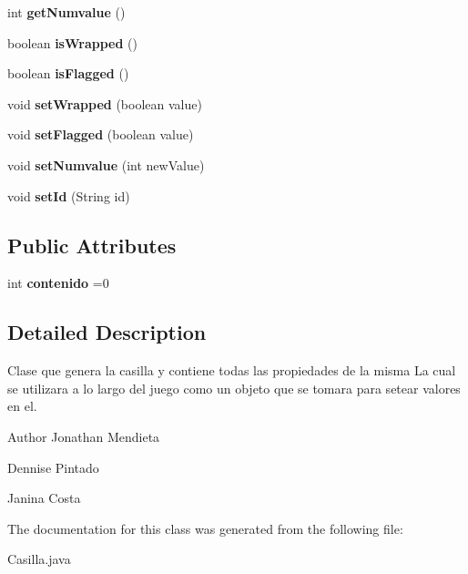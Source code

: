 \begin{DoxyCompactItemize}
\item 
int {\bfseries get\-Numvalue} ()\label{classcom_1_1example_1_1buscamina_1_1_casilla_a7705e8494acf1460a0eaef2e8fdf7c90}

\item 
boolean {\bfseries is\-Wrapped} ()\label{classcom_1_1example_1_1buscamina_1_1_casilla_aa0dc3120eb8434661528f4e8978e3f09}

\item 
boolean {\bfseries is\-Flagged} ()\label{classcom_1_1example_1_1buscamina_1_1_casilla_a34d209a5d1782a63bb01048acc5a2e7b}

\item 
void {\bfseries set\-Wrapped} (boolean value)\label{classcom_1_1example_1_1buscamina_1_1_casilla_a9b42d06df2f5a11fe12e0807b05cbaba}

\item 
void {\bfseries set\-Flagged} (boolean value)\label{classcom_1_1example_1_1buscamina_1_1_casilla_a1730617c082f2cd84cce038d829cc680}

\item 
void {\bfseries set\-Numvalue} (int new\-Value)\label{classcom_1_1example_1_1buscamina_1_1_casilla_a3ee133668c1e66b40337f43ffdc847d5}

\item 
void {\bfseries set\-Id} (String id)\label{classcom_1_1example_1_1buscamina_1_1_casilla_a36e517089613f4aa67f565ba6063f2e5}

\end{DoxyCompactItemize}
\subsection*{Public Attributes}
\begin{DoxyCompactItemize}
\item 
int {\bfseries contenido} =0\label{classcom_1_1example_1_1buscamina_1_1_casilla_af20ccddf9de5787c56e87e9b2787a713}

\end{DoxyCompactItemize}


\subsection{Detailed Description}
Clase que genera la casilla y contiene todas las propiedades de la misma La cual se utilizara a lo largo del juego como un objeto que se tomara para setear valores en el. 

\begin{DoxyAuthor}{Author}
Jonathan Mendieta 

Dennise Pintado 

Janina Costa 
\end{DoxyAuthor}


The documentation for this class was generated from the following file\-:\begin{DoxyCompactItemize}
\item 
Casilla.\-java\end{DoxyCompactItemize}
